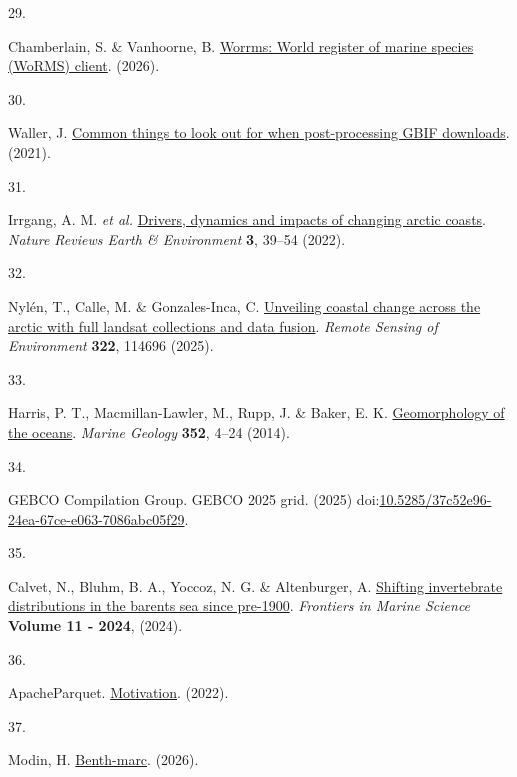 \documentclass[
  letterpaper,
  DIV=11,
  numbers=noendperiod]{scrartcl}
\newlength{\cslhangindent}
\newlength{\csllabelwidth}
\newenvironment{CSLReferences}[2] %
 {\begin{list}{}{%
  \setlength{\itemindent}{0pt}
  \setlength{\leftmargin}{0pt}
  \setlength{\parsep}{0pt}
  \ifodd #1
   \setlength{\leftmargin}{\cslhangindent}
   \setlength{\itemindent}{-1\cslhangindent}
  \fi
  \setlength{\itemsep}{#2\baselineskip}}}
 {\end{list}}
\newcommand{\CSLLeftMargin}[1]{\parbox[t]{\csllabelwidth}{\strut#1\strut}}
\newcommand{\CSLRightInline}[1]{\parbox[t]{\linewidth - \csllabelwidth}{\strut#1\strut}}
\begin{document}
\begin{CSLReferences}{0}{0}
\CSLLeftMargin{29. }%
\CSLRightInline{Chamberlain, S. \& Vanhoorne, B.
\href{https://github.com/ropensci/worrms}{Worrms: World register of
marine species (WoRMS) client}. (2026).}

\CSLLeftMargin{30. }%
\CSLRightInline{Waller, J.
\href{https://data-blog.gbif.org/post/gbif-filtering-guide/}{Common
things to look out for when post-processing GBIF downloads}. (2021).}

\CSLLeftMargin{31. }%
\CSLRightInline{Irrgang, A. M. \emph{et al.}
\href{https://doi.org/10.1038/s43017-021-00232-1}{Drivers, dynamics and
impacts of changing arctic coasts}. \emph{Nature Reviews Earth \&
Environment} \textbf{3}, 39--54 (2022).}

\CSLLeftMargin{32. }%
\CSLRightInline{Nylén, T., Calle, M. \& Gonzales-Inca, C.
\href{https://doi.org/10.1016/j.rse.2025.114696}{Unveiling coastal
change across the arctic with full landsat collections and data fusion}.
\emph{Remote Sensing of Environment} \textbf{322}, 114696 (2025).}

\CSLLeftMargin{33. }%
\CSLRightInline{Harris, P. T., Macmillan-Lawler, M., Rupp, J. \& Baker,
E. K. \href{https://doi.org/10.1016/j.margeo.2014.01.011}{Geomorphology
of the oceans}. \emph{Marine Geology} \textbf{352}, 4--24 (2014).}

\CSLLeftMargin{34. }%
\CSLRightInline{GEBCO Compilation Group. GEBCO 2025 grid. (2025)
doi:\href{https://doi.org/10.5285/37c52e96-24ea-67ce-e063-7086abc05f29}{10.5285/37c52e96-24ea-67ce-e063-7086abc05f29}.}

\CSLLeftMargin{35. }%
\CSLRightInline{Calvet, N., Bluhm, B. A., Yoccoz, N. G. \& Altenburger,
A. \href{https://doi.org/10.3389/fmars.2024.1421475}{Shifting
invertebrate distributions in the barents sea since pre-1900}.
\emph{Frontiers in Marine Science} \textbf{Volume 11 - 2024}, (2024).}

\CSLLeftMargin{36. }%
\CSLRightInline{ApacheParquet.
\href{https://parquet.apache.org/docs/overview/motivation/}{Motivation}.
(2022).}

\CSLLeftMargin{37. }%
\CSLRightInline{Modin, H.
\href{https://github.com/hanna-modin/arctic-benthic-biodiversity}{Benth-marc}.
(2026).}

\end{CSLReferences}
\end{document}
